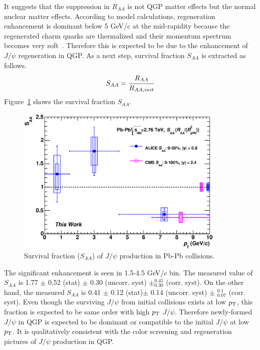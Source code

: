 It suggests that the suppression in $R_{AA}$ is not QGP matter effects but the normal nuclear matter effects. 
According to model calculations, regeneration enhancement is dominant below 5 GeV/c at the mid-rapidity  
because the regenerated charm quarks are thermalized and their momentum spectrum becomes very soft~\cite{bib_recomodel}. 
Therefore this is expected to be due to the enhancement of $J/\psi$ regeneration in QGP. 
As a next step, survival fraction $S_{AA}$ is extracted as follows. 
\begin{equation}
  	S_{AA}  = \cfrac{R_{AA}}{R_{AA, init}}
 \end{equation} 
Figure~\ref{fig_5_saa} shows the survival fraction $S_{AA}$. 
\begin{figure}[!h]
  \centering
  \includegraphics[width=10cm]{chap5/figure/SAA/JpsiSAA_wCMS_bin2_tw.eps}
  \caption{
	Survival fraction ($S_{AA}$) of $J/\psi$ production in Pb-Pb collisions. 
    }
  \label{fig_5_saa}
\end{figure}
The significant enhancement is seen in 1.5-4.5 GeV/$c$ bin. 
The measured value of $S_{AA}$ is 1.77 $\pm$ 0.52 (stat) $\pm$  0.30 (uncorr. syst) $\pm^{0.45}_{0.30}$ (corr. syst).
On the other hand, the measured $S_{AA}$ is 0.41 $\pm$  0.12 (stat)$ \pm$ 0.14 (uncorr. syst) $\pm$ $^{0.1}_{0.07}$ (corr. syst). 
Even though the surviving $J/\psi$ from initial collisions exists at low $p_{\rm{T}}$, this fraction is expected to be same order with high $p_{\rm{T}}$ $J/\psi$. 
Therefore newly-formed $J/\psi$ in QGP is expected to be dominant or compatible to the initial $J/\psi$ at low $p_{\rm{T}}$.   
It is qualitatively consistent with the color screening and regeneration pictures of $J/\psi$ production in QGP. 



